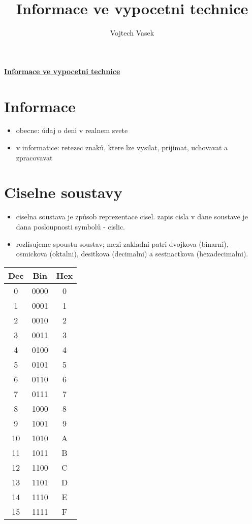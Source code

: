 \documentclass[a4paper,12pt]{article}
\title{Informace ve vypocetni technice}
\author{Vojtech Vasek}
\begin{document}
\begin{center}
    \huge{\underline{\textbf{Informace ve vypocetni technice}}}
\end{center}

\section{Informace}
    \begin{itemize}
        \item{obecne: údaj o deni v realnem svete}
        \item{v informatice: retezec znaků, ktere lze vysilat, prijimat, uchovavat a zpracovavat}
    \end{itemize}

\section{Ciselne soustavy}
    \begin{itemize}
        \item{ciselna soustava je způsob reprezentace cisel. zapis cisla v dane soustave je dana posloupnosti symbolů - cislic.}
        \item{rozlisujeme spoustu soustav; mezi zakladni patri dvojkova (binarni), osmickova (oktalni), desitkova (decimalni) a sestnactkova (hexadecimalni).}
    \end{itemize}
    \begin{center}\begin{tabular}{|c|c|c|}
        \hline
       Dec & Bin & Hex \\\hline\hline
         0 & 0000 & 0 \\\hline
         1 & 0001 & 1 \\\hline
         2 & 0010 & 2 \\\hline
         3 & 0011 & 3 \\\hline
         4 & 0100 & 4 \\\hline
         5 & 0101 & 5 \\\hline
         6 & 0110 & 6 \\\hline
         7 & 0111 & 7 \\\hline
         8 & 1000 & 8 \\\hline
         9 & 1001 & 9 \\\hline
        10 & 1010 & A \\\hline
        11 & 1011 & B \\\hline
        12 & 1100 & C \\\hline
        13 & 1101 & D \\\hline
        14 & 1110 & E \\\hline
        15 & 1111 & F \\\hline
    \end{tabular}\end{center}
\end{document}
